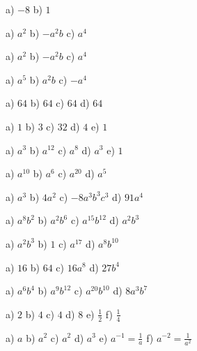 \begin{Vastaus}{15}
a) $ -8$ \qquad b) $1$
\end{Vastaus}
\begin{Vastaus}{16}
a) $a^2$ \qquad b) $-a^2b$ \qquad c) $a^4$
\end{Vastaus}
\begin{Vastaus}{17}
a) $a^2$ \qquad b) $-a^2b$ \qquad c) $a^4$
\end{Vastaus}
\begin{Vastaus}{18}
a) $a^5$ \qquad b) $a^2b$ \qquad c) $-a^4$
\end{Vastaus}
\begin{Vastaus}{19}
a) $64$ \qquad b) $64$ \qquad c) $64$ \qquad d) $64$
\end{Vastaus}
\begin{Vastaus}{20}
a) $1$ \qquad b) $3$ \qquad c) $32$ \qquad d) $4$ \qquad e) $1$
\end{Vastaus}
\begin{Vastaus}{21}
a) $a^3$ \qquad b) $a^{12}$ \qquad c) $a^8$ \qquad d) $a^3$ \qquad e) $1$
\end{Vastaus}
\begin{Vastaus}{22}
a) $a^{10}$ \qquad b) $a^6$ \qquad c) $a^{20}$ \qquad d) $a^5$
\end{Vastaus}
\begin{Vastaus}{23}
a) $a^3$ \qquad b) $4a^2$ \qquad c) $-8a^3b^3c^3$ \qquad d) $91a^4$
\end{Vastaus}
\begin{Vastaus}{24}
a) $a^8b^2$ \qquad b) $a^2b^6$ \qquad c) $a^{15}b^{12}$ \qquad d) $a^2b^3$
\end{Vastaus}
\begin{Vastaus}{25}
a) $a^2b^3$ \qquad b) $1$ \qquad c) $a^{17}$ \qquad d) $a^8b^{10}$
\end{Vastaus}
\begin{Vastaus}{26}
a) $16$ \qquad b) $64$ \qquad c) $16a^8$ \qquad d) $27b^4$
\end{Vastaus}
\begin{Vastaus}{27}
a) $a^6b^4$ \qquad b) $a^9b^{12}$ \qquad c) $a^{20}b^{10}$ \qquad d) $8a^3b^7$
\end{Vastaus}
\begin{Vastaus}{28}
a) $2$ \qquad b) $4$ \qquad c) $4$ \qquad d) $8$ \qquad e) $\frac{1}{2}$ \qquad f) $\frac{1}{4}$
\end{Vastaus}
\begin{Vastaus}{29}
a) $a$ \qquad b) $a^2$ \qquad c) $a^2$ \qquad d) $a^3$ \qquad e) $a^{-1} = \frac{1}{a}$ \qquad f) $a^{-2} = \frac{1}{a^2}$
\end{Vastaus}
